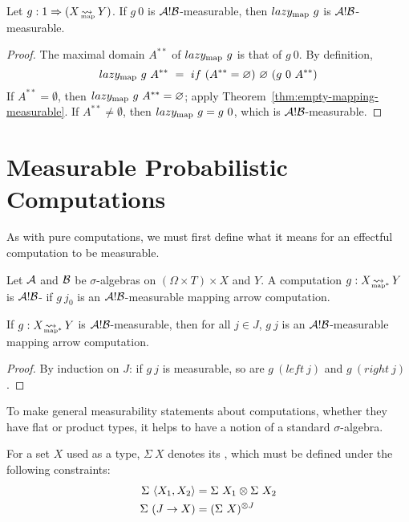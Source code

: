 \begin{theorem}
Let $g : 1 \Rightarrow (X \operatorname{\rightsquigarrow_{\mspace{-23mu}_\mathrm{map}}} Y)$. If $g~0$ is $\mathcal{A}!\mathcal{B}$-measurable, then $lazy_\mathrm{map}~g$ is $\mathcal{A}!\mathcal{B}$-measurable.
\end{theorem}
\begin{proof}
The maximal domain $A^{**}$ of $lazy_\mathrm{map}~g$ is that of $g~0$.
By definition,
\begin{equation}
	lazy_\mathrm{map}~g~A^{**} \ = \ if~(A^{**} = \varnothing)~\varnothing~(g~0~A^{**})
\end{equation}
If $A^{**} = \emptyset$, then $lazy_\mathrm{map}~g~A^{**} = \varnothing$; apply Theorem~\ref{thm:empty-mapping-measurable}.
If $A^{**} \neq \emptyset$, then $lazy_\mathrm{map}~g = g~0$, which is $\mathcal{A}!\mathcal{B}$-measurable.
\end{proof}

\section{Measurable Probabilistic Computations}

As with pure computations, we must first define what it means for an effectful computation to be measurable.

\begin{definition}
Let $\mathcal{A}$ and $\mathcal{B}$ be $\sigma$-algebras on $(\Omega \times T) \times X$ and $Y$.
A computation $g : X \operatorname{\rightsquigarrow_{\mspace{-25mu}_{\mathrm{map*}}}} Y$ is $\mathcal{A}!\mathcal{B}$- if $g~j_0$ is an $\mathcal{A}!\mathcal{B}$-measurable mapping arrow computation.
\end{definition}

\begin{theorem}
If $g : X \operatorname{\rightsquigarrow_{\mspace{-25mu}_{\mathrm{map*}}}} Y$ is $\mathcal{A}!\mathcal{B}$-measurable, then for all $j \in J$, $g~j$ is an $\mathcal{A}!\mathcal{B}$-measurable mapping arrow computation.
\end{theorem}
\begin{proof}
By induction on $J$: if $g~j$ is measurable, so are $g~(left~j)$ and $g~(right~j)$.
\end{proof}

To make general measurability statements about computations, whether they have flat or product types, it helps to have a notion of a standard $\sigma$-algebra.

\begin{definition}
\label{def:standard-sigma-algebra}
For a set $X$ used as a type, $\Sigma~X$ denotes its , which must be defined under the following constraints:
\begin{align}
	\Sigma~\langle{X_1,X_2}\rangle & = \Sigma~X_1 \otimes \Sigma~X_2
	\label{eqn:standard-finite-product-rule}
\\
	\Sigma~(J \to X) & = (\Sigma~X)^{\otimes J}
	\label{eqn:standard-arbitrary-product-rule}
\end{align}
\end{definition}

